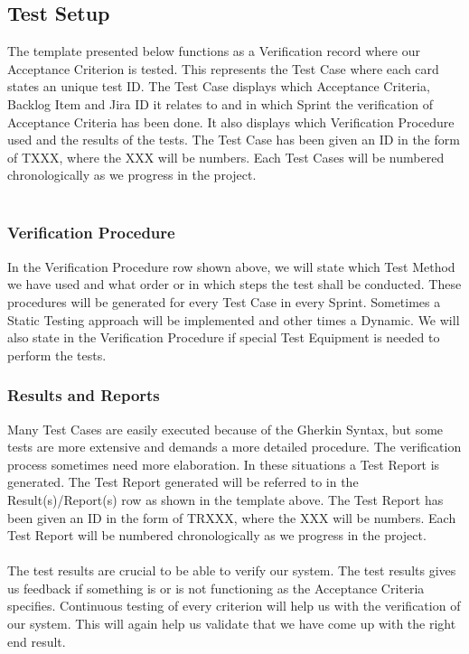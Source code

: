 \newpage

\subsection {Test Setup}
The template presented below functions as a Verification record where our Acceptance Criterion is tested. This represents the Test Case where each card states an unique test ID. The Test Case displays which Acceptance Criteria, Backlog Item and Jira ID it relates to and in which Sprint the verification of Acceptance Criteria has been done. It also displays which Verification Procedure used and the results of the tests. The Test Case has been given an ID in the form of TXXX, where the XXX will be numbers. Each Test Cases will be numbered chronologically as we progress in the project. \\
\\
         {}
         {\shortstack[l]{}}
         {}
         {\shortstack[l]{}}

\subsubsection{Verification Procedure}
In the Verification Procedure row shown above, we will state which Test Method we have used and what order or in which steps the test shall be conducted. These procedures will be generated for every Test Case in every Sprint. Sometimes a Static Testing approach will be implemented and other times a Dynamic. We will also state in the Verification Procedure if special Test Equipment is needed to perform the tests.
\\
\subsubsection{Results and Reports}
Many Test Cases are easily executed because of the Gherkin Syntax, but some tests are more extensive and demands a more detailed procedure. The verification process sometimes need more elaboration. In these situations a Test Report is generated. The Test Report generated will be referred to in the Result(s)/Report(s) row as shown in the template above. The Test Report has been given an ID in the form of TRXXX, where the XXX will be numbers. Each Test Report will be numbered chronologically as we progress in the project. \\ 
\\
The test results are crucial to be able to verify our system. The test results gives us feedback if something is or is not functioning as the Acceptance Criteria specifies. Continuous testing of every criterion will help us with the verification of our system. This will again help us validate that we have come up with the right end result.\\
\newpage

